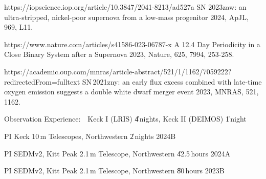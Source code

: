 \begin{cvpubs}
{\begin{cvitems}
    \item {} 
    {\Cliu}
    {https://iopscience.iop.org/article/10.3847/2041-8213/ad527a}
    {SN 2023zaw: an ultra-stripped, nickel-poor supernova from a low-mass progenitor}
    {2024, ApJL, 969, L11.}
    \item {} 
    {\Cliu}
    {https://www.nature.com/articles/s41586-023-06787-x}
    {A 12.4 Day Periodicity in a Close Binary System after a Supernova}
    {2023, Nature, 625, 7994, 253-258.}
    \item {} 
    {\Cliu}
    {https://academic.oup.com/mnras/article-abstract/521/1/1162/7059222?redirectedFrom=fulltext}
    {SN\,2021zny: an early flux excess combined with late-time oxygen emission suggests a double white dwarf merger event}
    {2023, MNRAS, 521, 1162.}
\end{cvitems}
}


\end{cvpubs}





\begin{cventries}

\cvpub
{ %
{Observation Experience:}\ \ Keck I (LRIS) \| 4\,nights, Keck II (DEIMOS) \| 1\,night
}

\cvsimpentry
    {PI}
    {Keck 10\,m Telescopes, Northwestern \| 2\,nights}
    {2024B}
    {}

\cvsimpentry
	{PI}
	{SEDMv2, Kitt Peak 2.1\,m Telescope, Northwestern \| 42.5\,hours}
	{2024A}
	{} 

\cvsimpentry
	{PI}
	{SEDMv2, Kitt Peak 2.1\,m Telescope, Northwestern \| 80\,hours}
	{2023B}
	{}





\end{cventries}